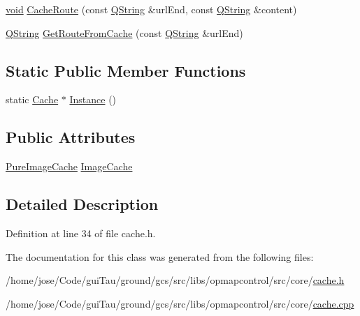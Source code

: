\begin{DoxyCompactItemize}
\item 
\hyperlink{group___u_a_v_objects_plugin_ga444cf2ff3f0ecbe028adce838d373f5c}{void} \hyperlink{group___o_p_map_widget_ga39845c04f9d203c0a71e50b1576e71c6}{Cache\-Route} (const \hyperlink{group___u_a_v_objects_plugin_gab9d252f49c333c94a72f97ce3105a32d}{Q\-String} \&url\-End, const \hyperlink{group___u_a_v_objects_plugin_gab9d252f49c333c94a72f97ce3105a32d}{Q\-String} \&content)
\item 
\hyperlink{group___u_a_v_objects_plugin_gab9d252f49c333c94a72f97ce3105a32d}{Q\-String} \hyperlink{group___o_p_map_widget_gaa57f8065b3641c25a3305de4ab621abe}{Get\-Route\-From\-Cache} (const \hyperlink{group___u_a_v_objects_plugin_gab9d252f49c333c94a72f97ce3105a32d}{Q\-String} \&url\-End)
\end{DoxyCompactItemize}
\subsection*{Static Public Member Functions}
\begin{DoxyCompactItemize}
\item 
static \hyperlink{classcore_1_1_cache}{Cache} $\ast$ \hyperlink{group___o_p_map_widget_ga44699cf1986c874eb8375e3d795a1456}{Instance} ()
\end{DoxyCompactItemize}
\subsection*{Public Attributes}
\begin{DoxyCompactItemize}
\item 
\hyperlink{classcore_1_1_pure_image_cache}{Pure\-Image\-Cache} \hyperlink{group___o_p_map_widget_gab71cf242d304174673b1385ade1915bd}{Image\-Cache}
\end{DoxyCompactItemize}


\subsection{Detailed Description}


Definition at line 34 of file cache.\-h.



The documentation for this class was generated from the following files\-:\begin{DoxyCompactItemize}
\item 
/home/jose/\-Code/gui\-Tau/ground/gcs/src/libs/opmapcontrol/src/core/\hyperlink{cache_8h}{cache.\-h}\item 
/home/jose/\-Code/gui\-Tau/ground/gcs/src/libs/opmapcontrol/src/core/\hyperlink{cache_8cpp}{cache.\-cpp}\end{DoxyCompactItemize}

